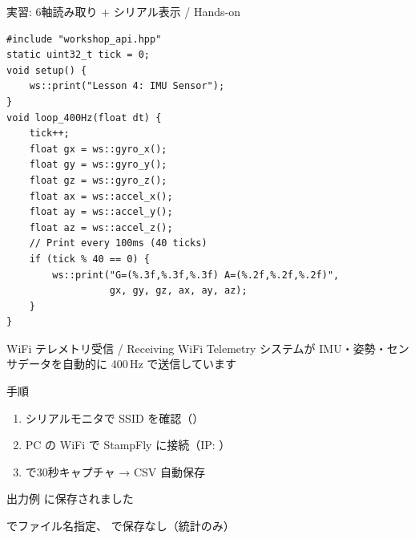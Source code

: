 \documentclass[aspectratio=169, 14pt]{beamer}
\begin{document}
\begin{frame}[fragile]{実習: 6軸読み取り + シリアル表示 / Hands-on}
  \begin{lstlisting}[style=sfcpp, title={user\_code.cpp}]
#include "workshop_api.hpp"
static uint32_t tick = 0;
void setup() {
    ws::print("Lesson 4: IMU Sensor");
}
void loop_400Hz(float dt) {
    tick++;
    float gx = ws::gyro_x();
    float gy = ws::gyro_y();
    float gz = ws::gyro_z();
    float ax = ws::accel_x();
    float ay = ws::accel_y();
    float az = ws::accel_z();
    // Print every 100ms (40 ticks)
    if (tick % 40 == 0) {
        ws::print("G=(%.3f,%.3f,%.3f) A=(%.2f,%.2f,%.2f)",
                  gx, gy, gz, ax, ay, az);
    }
}
  \end{lstlisting}
\end{frame}

\begin{frame}{WiFi テレメトリ受信 / Receiving WiFi Telemetry}
  {\small システムが IMU・姿勢・センサデータを自動的に 400\,Hz で送信しています}
  \vspace{0.3em}
  \begin{block}{手順}
    \begin{enumerate}
      \item シリアルモニタで SSID を確認（）
      \item PC の WiFi で StampFly に接続（IP: ）
      \item {} で30秒キャプチャ → CSV 自動保存
    \end{enumerate}
  \end{block}

  \vspace{0.5em}

  \begin{exampleblock}{出力例}
     に保存されました
  \end{exampleblock}

  \vspace{0.3em}
  {\small
   でファイル名指定、 で保存なし（統計のみ）
  }
\end{frame}
\end{document}
